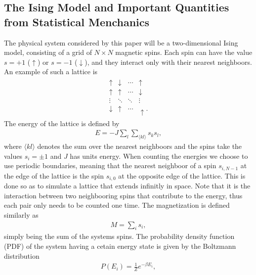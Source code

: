 \documentclass[twocolumn]{aastex62}
\begin{document}
\subsection{The Ising Model and Important Quantities from Statistical Menchanics} \label{subsec:ising_model}
The physical system considered by this paper will be a two-dimensional Ising
model, consisting of a grid of $N\times N$ magnetic spins. Each spin can have
the value $s = +1$ ($\uparrow$) or $s = -1$ ($\downarrow$), and they interact only with their nearest neighboors. An
example of such a lattice is 
\begin{align}
	\begin{smallmatrix}
		\uparrow & \downarrow & \cdots &\uparrow \\
		\uparrow & \uparrow & \cdots & \downarrow \\
		\vdots & \ddots & \ddots & \vdots \\
		\downarrow & \uparrow & \cdots & \uparrow.
	\end{smallmatrix}
\end{align}
The energy of the lattice is defined by 
\begin{align}
	E = -J\sum_l\sum_{\langle kl\rangle} s_k s_l,
	\label{eq:energy}
\end{align}
where $\langle kl\rangle$ denotes the sum over the nearest neighboors and the
spins take the values $s_i = \pm 1$ and $J$ has units energy. When counting the
energies we choose to use periodic boundaries, meaning that the nearest
neighboor of a spin $s_{i,N-1}$ at the edge of the lattice is the spin $s_{i,0}$
at the opposite edge of the lattice. This is done so as to simulate a lattice
that extends infinitly in space. Note that it is the interaction between two
neighbooring spins that contribute to the energy, thus each pair only needs to
be counted one time.
The magnetization is defined similarly as 
\begin{align}
	M = \sum_i s_i,	
	\label{eq:magnetization}
\end{align} 
simply being the sum of the systems spins. The probability density function (PDF) of the system having
a cetain energy state is given by the Boltzmann distribution 
\begin{align}
	P(E_i) = \frac{1}{Z}e^{-\beta E_i},
\end{align}
\end{document}
